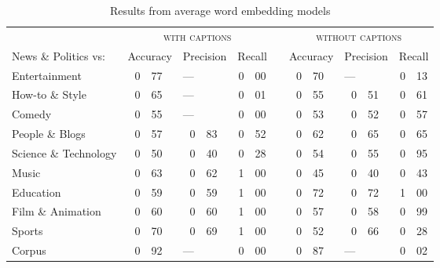 \documentclass[letterpaper, 12pt]{article}
\begin{document}
\begin{table}[H]
  \centering
  \caption*{Results from average word embedding models}
  \begin{tabular}{lr@{.}lr@{.}lr@{.}lp{1em}r@{.}lr@{.}lr@{.}l}
    \toprule
    & \multicolumn{6}{c}{\textsc{with captions}} & & \multicolumn{6}{c}{\textsc{without captions}} \\
    \cmidrule{2-7} \cmidrule{9-14}
    News \& Politics vs: & \multicolumn{2}{r}{Accuracy} & \multicolumn{2}{r}{Precision} & \multicolumn{2}{r}{Recall} & & \multicolumn{2}{r}{Accuracy} & \multicolumn{2}{r}{Precision} & \multicolumn{2}{r}{Recall} \\
    \midrule
    Entertainment         & 0 & 77  & \multicolumn{2}{l}{---} & 0 & 00 & & 0 & 70 &	\multicolumn{2}{l}{---} &	0 & 13 \\
    How-to \& Style       & 0 & 65	& \multicolumn{2}{l}{---}	& 0 & 01 & & 0 & 55 &	0 & 51                  &	0 & 61 \\
    Comedy                & 0 & 55	& \multicolumn{2}{l}{---}	& 0 & 00 & & 0 & 53 &	0 & 52                  &	0 & 57 \\
    People \& Blogs       & 0 & 57	& 0 & 83                  &	0 & 52 & & 0 & 62 &	0 & 65                  &	0 & 65 \\
    Science \& Technology & 0 & 50	& 0 & 40                  &	0 & 28 & & 0 & 54 &	0 & 55                  & 0 & 95 \\
    Music                 & 0 & 63	& 0 & 62                  &	1 & 00 & & 0 & 45 &	0 & 40                  &	0 & 43 \\
    Education             & 0 & 59	& 0 & 59                  &	1 & 00 & & 0 & 72 &	0 & 72                  &	1 & 00 \\
    Film \& Animation     & 0 & 60	& 0 & 60                  &	1 & 00 & & 0 & 57 &	0 & 58                  &	0 & 99 \\
    Sports                & 0 & 70	& 0 & 69                  & 1 & 00 & & 0 & 52 &	0 & 66                  &	0 & 28 \\
    \bottomrule
    Corpus                & 0 & 92  & \multicolumn{2}{l}{---} & 0 & 00 & & 0 & 87 &	\multicolumn{2}{l}{---}	& 0 & 02 \\
  \end{tabular}
\end{table}
\end{document}
